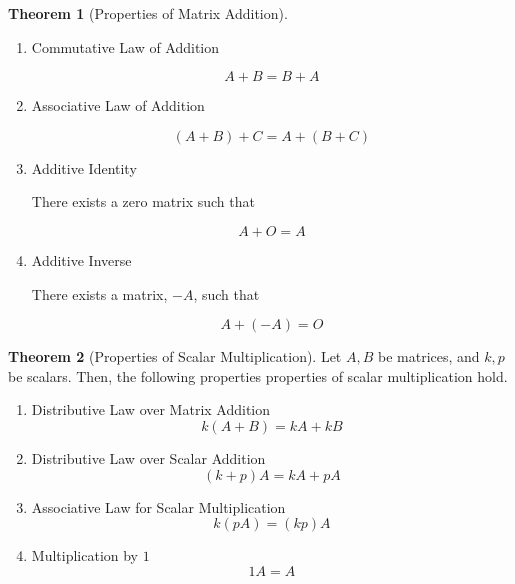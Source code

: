 \documentclass[12pt]{amsart}
\theoremstyle{definition}
\newtheorem{theorem}{Theorem}
\begin{document}
\begin{enumerate}[itemsep=0.8em,leftmargin=0pt]
\begin{theorem}[Properties of Matrix Addition]
\begin{enumerate}
\item\label{item:mataddcomm} Commutative Law of Addition

$$A+B=B+A$$  


\item \label{item:mataddass} Associative Law of Addition

$$\left( A+B\right) +C=A+\left( B+C\right) $$


\item\label{item:mataddid} Additive Identity
\begin{center}
There exists a zero matrix such that
\end{center}
$$A+O=A$$


\item\label{item:mataddinv} Additive Inverse
\begin{center}
There exists a matrix, $-A$, such that
\end{center}
$$A+\left( -A\right) =O $$

\end{enumerate}
\end{theorem}

\begin{theorem}[Properties of Scalar Multiplication]\label{th:propertiesscalarmult}
Let $A, B$ be matrices, and $k, p$ be scalars. Then, the following properties properties of scalar multiplication hold.
\begin{enumerate}
\item\label{item:scalardistmatadd} Distributive Law over Matrix Addition
\begin{equation*}
k \left( A+B\right) =k A+ kB  
\end{equation*}

\item \label{item:matdistscalaradd}Distributive Law over Scalar Addition
\begin{equation*}
\left( k +p \right) A= k A+p A
\end{equation*}

\item \label{item:scalarmatmultass}Associative Law for Scalar Multiplication
\begin{equation*}
k \left( p A\right) = \left( k p \right) A 
\end{equation*}

\item\label{item:matmult1} Multiplication by $1$
\begin{equation*}
1A=A  
\end{equation*}
\end{enumerate}


\end{theorem}
\end{enumerate}
\end{document}
